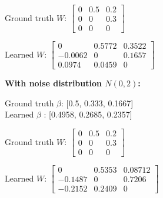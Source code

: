 Ground truth $W$: $\begin{bmatrix}
	0 & 0.5 & 0.2 \\
	0 & 0 & 0.3 \\
	0 & 0 & 0
\end{bmatrix}$

Learned $W$: $\begin{bmatrix}
	0 & 0.5772 & 0.3522 \\
	-0.0062 & 0 & 0.1657 \\
	0.0974 & 0.0459 & 0
\end{bmatrix}$

\textbf{With noise distribution $N(0, 2)$:}

Ground truth $\beta$: [0.5, 0.333, 0.1667] \\
Learned $\beta$ : [0.4958, 0.2685, 0.2357]

Ground truth $W$: $\begin{bmatrix}
	0 & 0.5 & 0.2 \\
	0 & 0 & 0.3 \\
	0 & 0 & 0
\end{bmatrix}$

Learned $W$: $\begin{bmatrix}
	0 & 0.5353 & 0.08712 \\
	-0.1487 & 0 & 0.7206 \\
	-0.2152 & 0.2409 & 0
\end{bmatrix}$